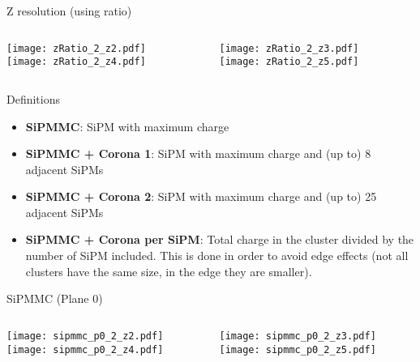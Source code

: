 \documentclass{beamer}
\begin{document}
\begin{frame}{Z resolution (using ratio)}
	\begin{columns}[onlytextwidth]
		\begin{column}{0.5\textwidth}
			\texttt{[image: zRatio\_2\_z2.pdf]} \\
			\texttt{[image: zRatio\_2\_z4.pdf]}
		 \end{column}
		 \begin{column}{0.5\textwidth}
			\texttt{[image: zRatio\_2\_z3.pdf]} \\
			\texttt{[image: zRatio\_2\_z5.pdf]}
		 \end{column}
 \end{columns}
\end{frame}

\begin{frame}{Definitions}
\begin{itemize}
\item \textbf{SiPMMC}: SiPM with maximum charge
\item \textbf{SiPMMC + Corona 1}: SiPM with maximum charge and (up to) 8 adjacent SiPMs
\item \textbf{SiPMMC + Corona 2}: SiPM with maximum charge and (up to) 25 adjacent SiPMs
\item \textbf{SiPMMC + Corona per SiPM}: Total charge in the cluster divided by the number of SiPM included. This is done in order to avoid edge effects (not all clusters have the same size, in the edge they are smaller).
\end{itemize}
\end{frame}

\begin{frame}{SiPMMC (Plane 0)}
	\begin{columns}[onlytextwidth]
		\begin{column}{0.5\textwidth}
			\texttt{[image: sipmmc\_p0\_2\_z2.pdf]} \\
			\texttt{[image: sipmmc\_p0\_2\_z4.pdf]}
		 \end{column}
		 \begin{column}{0.5\textwidth}
			\texttt{[image: sipmmc\_p0\_2\_z3.pdf]} \\
			\texttt{[image: sipmmc\_p0\_2\_z5.pdf]}
		 \end{column}
 \end{columns}
\end{frame}
\end{document}
